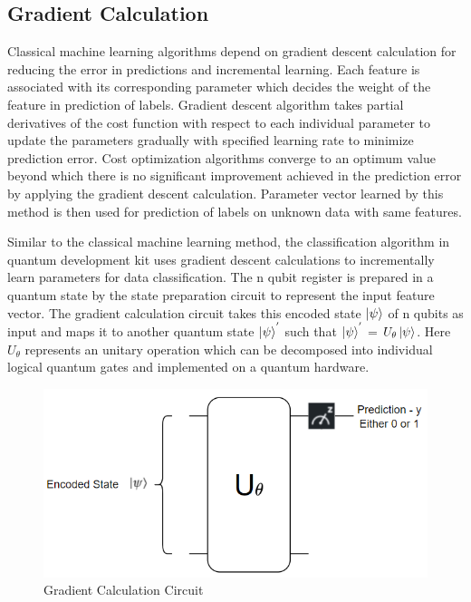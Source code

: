 \documentclass[english,a4paper,11pt,oneside,onecolumn]{book}
\begin{document}
\subsection{Gradient Calculation}
Classical machine learning algorithms depend on gradient descent calculation \cite{bottou_2010_largescale} for reducing the error in predictions and incremental learning. Each feature is associated with its corresponding parameter which decides the weight of the feature in prediction of labels. Gradient descent algorithm takes partial derivatives of the cost function with respect to each individual parameter to update the parameters gradually with specified learning rate to minimize prediction error. Cost optimization algorithms converge to an optimum value beyond which there is no significant improvement achieved in the prediction error by applying the gradient descent calculation. Parameter vector learned by this method is then used for prediction of labels on unknown data with same features.

Similar to the classical machine learning method, the classification algorithm in quantum development kit uses gradient descent calculations \cite{schuld_2020_circuitcentric} to incrementally learn parameters for data classification. The n qubit register is prepared in a quantum state by the state preparation circuit to represent the input feature vector. The gradient calculation circuit takes this encoded state \(\ket{\psi}\) of n qubits as input and maps it to another quantum state \(\ket{\psi}^{'}\) such that \(\ket{\psi}^{'}\) = \(U_{\theta} \ket{\psi}\). Here \(U_{\theta}\) represents an unitary operation which can be decomposed into individual logical quantum gates and implemented on a quantum hardware.

\begin{figure}[H]
    \centering
    \includegraphics[scale=0.9]{Images/GradientCalculationCircuit.PNG}
    \caption{Gradient Calculation Circuit}
    \label{fig:gradeCalcCirc}
\end{figure}
\end{document}
